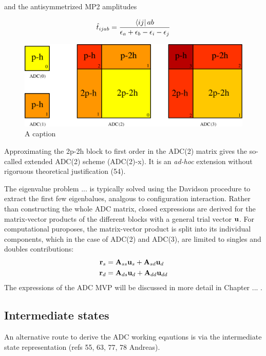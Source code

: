 and the antisymmetrized MP2 amplitudes

\begin{equation}
\hat{t}_{ijab} = \frac{\bra{\smash{ij}}{ab}}{\epsilon_a + \epsilon_b - \epsilon_i - \epsilon_j}
\end{equation}

\begin{figure}
\centering
\includegraphics[scale=0.4]{Pics/ADCMAT2}
\caption{A caption}
\label{fig:ADCMAT}
\end{figure}

Approximating the 2p-2h block to first order in the ADC(2) matrix gives the so-called extended ADC(2) scheme (ADC(2)-x). It is an \emph{ad-hoc} extension without rigoruous theoretical justification (54).  

The eigenvalue problem ... is typically solved using the Davidson procedure to extract the first few eigenbalues, analgous to configuration interaction. Rather than constructing the whole ADC matrix, closed expressions are derived for the matrix-vector products of the different blocks with a general trial vector $\mathbf{u}$. For computational puroposes, the matrix-vector product is split into its individual components, which in the case of ADC(2) and ADC(3), are limited to singles and doubles contributions:
\begin{align}
\mathbf{r}_s &= \mathbf{A}_{ss} \mathbf{u}_s + \mathbf{A}_{sd} \mathbf{u}_d \\
\mathbf{r}_d &= \mathbf{A}_{ds} \mathbf{u}_d + \mathbf{A}_{dd} \mathbf{u}_{dd} 
\end{align}
\noindent The expressions of the ADC MVP will be discussed in more detail in Chapter ... .

\subsection{Intermediate states}

An alternative route to derive the ADC working eqautions is via the intermediate state representation (refs 55, 63, 77, 78 Andreas). 

